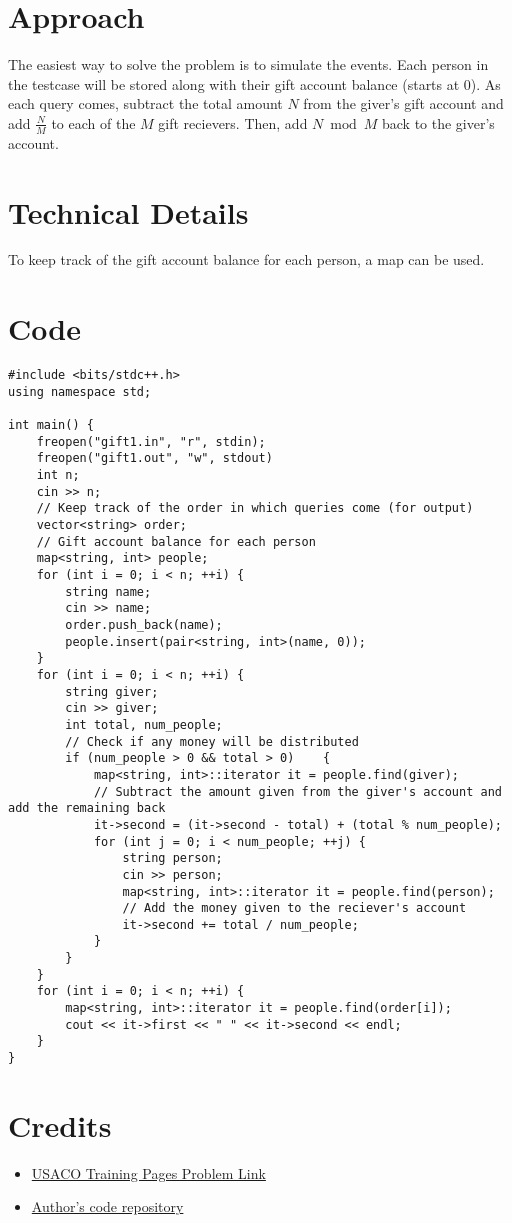 \documentclass{article}
\begin{document}
\section*{Approach}
The easiest way to solve the problem is to simulate the events. Each person in the testcase will be stored along with their gift account balance (starts at $0$). As each query comes, subtract the total amount $N$ from the giver's gift account and add $\frac{N}{M}$ to each of the $M$ gift recievers. Then, add $N \bmod M$ back to the giver's account.
\section*{Technical Details}
To keep track of the gift account balance for each person, a map can be used.
\newpage
\section*{Code}
\begin{lstlisting}
#include <bits/stdc++.h>
using namespace std;

int main() {
	freopen("gift1.in", "r", stdin);
	freopen("gift1.out", "w", stdout)
	int n;
	cin >> n;
	// Keep track of the order in which queries come (for output)
	vector<string> order;
	// Gift account balance for each person
	map<string, int> people;
	for (int i = 0; i < n; ++i) {
		string name;
		cin >> name;
		order.push_back(name);
		people.insert(pair<string, int>(name, 0));	
	}
	for (int i = 0; i < n; ++i) {
		string giver;
		cin >> giver;
		int total, num_people;
		// Check if any money will be distributed
		if (num_people > 0 && total > 0)	{
			map<string, int>::iterator it = people.find(giver);
			// Subtract the amount given from the giver's account and add the remaining back
			it->second = (it->second - total) + (total % num_people);
			for (int j = 0; i < num_people; ++j) {
				string person;
				cin >> person;
				map<string, int>::iterator it = people.find(person);
				// Add the money given to the reciever's account
				it->second += total / num_people;			
			}		
		}
	}
	for (int i = 0; i < n; ++i) {
		map<string, int>::iterator it = people.find(order[i]);
		cout << it->first << " " << it->second << endl;	
	}
}
\end{lstlisting}
\section*{Credits}
\begin{itemize}
\item \href{https://train.usaco.org/usacoprob2?a=ZlhUsWu1CUO&S=gift1}{USACO Training Pages Problem Link}
\item \href{https://github.com/gap-prog/Competitive-Programming}{Author's code repository}
\end{itemize}
\end{document}
